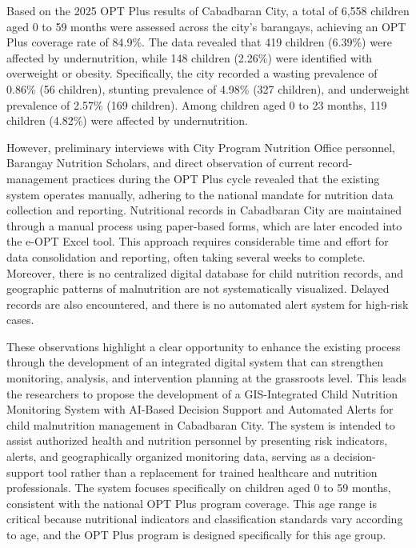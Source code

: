 \documentclass[12pt, a4paper]{report}
\begin{document}
Based on the 2025 OPT Plus results of Cabadbaran City, a total of 6,558 children aged 0 to 59 months were assessed across the city's barangays, achieving an OPT Plus coverage rate of 84.9\%. The data revealed that 419 children (6.39\%) were affected by undernutrition, while 148 children (2.26\%) were identified with overweight or obesity. Specifically, the city recorded a wasting prevalence of 0.86\% (56 children), stunting prevalence of 4.98\% (327 children), and underweight prevalence of 2.57\% (169 children). Among children aged 0 to 23 months, 119 children (4.82\%) were affected by undernutrition.

However, preliminary interviews with City Program Nutrition Office personnel, Barangay Nutrition Scholars, and direct observation of current record-management practices during the OPT Plus cycle revealed that the existing system operates manually, adhering to the national mandate for nutrition data collection and reporting. Nutritional records in Cabadbaran City are maintained through a manual process using paper-based forms, which are later encoded into the e-OPT Excel tool. This approach requires considerable time and effort for data consolidation and reporting, often taking several weeks to complete. Moreover, there is no centralized digital database for child nutrition records, and geographic patterns of malnutrition are not systematically visualized. Delayed records are also encountered, and there is no automated alert system for high-risk cases.

These observations highlight a clear opportunity to enhance the existing process through the development of an integrated digital system that can strengthen monitoring, analysis, and intervention planning at the grassroots level. This leads the researchers to propose the development of a GIS-Integrated Child Nutrition Monitoring System with AI-Based Decision Support and Automated Alerts for child malnutrition management in Cabadbaran City. The system is intended to assist authorized health and nutrition personnel by presenting risk indicators, alerts, and geographically organized monitoring data, serving as a decision-support tool rather than a replacement for trained healthcare and nutrition professionals. The system focuses specifically on children aged 0 to 59 months, consistent with the national OPT Plus program coverage. This age range is critical because nutritional indicators and classification standards vary according to age, and the OPT Plus program is designed specifically for this age group.
\end{document}
